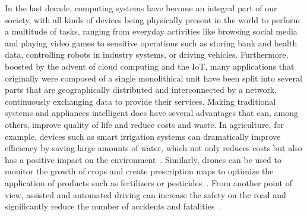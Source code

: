 In the last decade, computing systems have become an integral part of our
society, with all kinds of devices being physically present in the world to
perform a multitude of tasks, ranging from everyday activities like browsing
social media and playing video games to sensitive operations such as storing
bank and health data, controlling robots in industry systems, or driving
vehicles. Furthermore, boosted by the advent of cloud computing and the
\ac{IoT}, many applications that originally were composed of a single
monolithical unit have been split into several parts that are geographically
distributed and interconnected by a network, continuously exchanging data to
provide their services. Making traditional systems and appliances intelligent
does have several advantages that can, among others, improve quality of life and
reduce costs and waste. In agriculture, for example, devices such as smart
irrigation systems can dramatically improve efficiency by saving large amounts
of water, which not only reduces costs but also has a positive impact on the
environment~\cite{elsayed2021smartFarming}. Similarly, drones can be used to
monitor the growth of crops and create prescription maps to optimize the
application of products such as fertilizers or pesticides~\cite{inoue2020drone}.
From another point of view, assisted and automated driving can increase the
safety on the road and significantly reduce the number of accidents and
fatalities~\cite{nhtsaVehicleSafety}.

